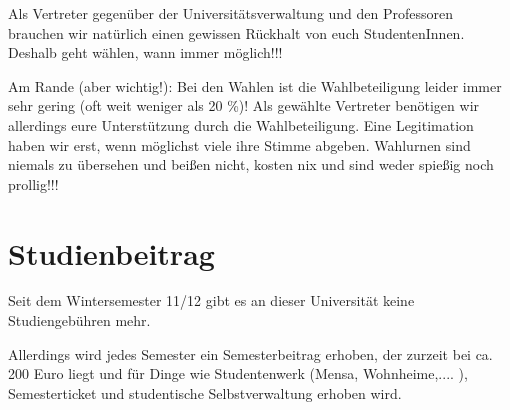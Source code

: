 Als Vertreter gegenüber der Universitätsverwaltung und den Professoren brauchen wir natürlich einen gewissen Rückhalt von euch StudentenInnen. Deshalb geht wählen, wann immer möglich!!!

Am Rande (aber wichtig!): Bei den Wahlen ist die Wahlbeteiligung leider immer sehr gering (oft weit weniger als 20 \%)! Als gewählte Vertreter benötigen wir allerdings eure Unterstützung durch die Wahlbeteiligung. Eine Legitimation haben wir erst, wenn möglichst viele ihre Stimme abgeben. Wahlurnen sind niemals zu übersehen und beißen nicht, kosten nix und sind weder spießig noch prollig!!!

\section*{Studienbeitrag}
Seit dem Wintersemester 11/12 gibt es an dieser Universität keine Studiengebühren mehr.

Allerdings wird jedes Semester ein Semesterbeitrag erhoben, der zurzeit bei ca. 200 Euro liegt und für Dinge wie Studentenwerk (Mensa, Wohnheime,.... ), Semesterticket und studentische Selbstverwaltung erhoben wird.

